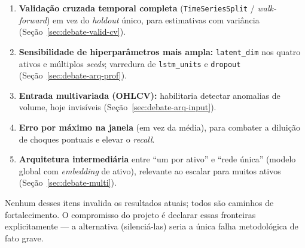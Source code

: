 \begin{enumerate}[noitemsep]
  \item \textbf{Validação cruzada temporal completa} (\texttt{TimeSeriesSplit} /
        \emph{walk-forward}) em vez do \emph{holdout} único, para estimativas com
        variância (Seção~\ref{sec:debate-valid-cv}).
  \item \textbf{Sensibilidade de hiperparâmetros mais ampla:} \texttt{latent\_dim}
        nos quatro ativos e múltiplos \emph{seeds}; varredura de
        \texttt{lstm\_units} e \texttt{dropout} (Seção~\ref{sec:debate-arq-prof}).
  \item \textbf{Entrada multivariada (OHLCV):} habilitaria detectar anomalias de
        volume, hoje invisíveis (Seção~\ref{sec:debate-arq-input}).
  \item \textbf{Erro por máximo na janela} (em vez da média), para combater a
        diluição de choques pontuais e elevar o \emph{recall}.
  \item \textbf{Arquitetura intermediária} entre ``um por ativo'' e ``rede única''
        (modelo global com \emph{embedding} de ativo), relevante ao escalar para
        muitos ativos (Seção~\ref{sec:debate-multi}).
\end{enumerate}

Nenhum desses itens invalida os resultados atuais; todos são caminhos de
fortalecimento. O compromisso do projeto é declarar essas fronteiras
explicitamente --- a alternativa (silenciá-las) seria a única falha
metodológica de fato grave.
